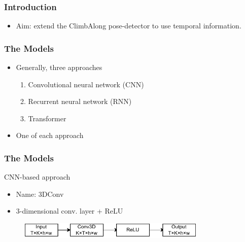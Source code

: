 \documentclass{beamer}
\begin{document}
\begin{frame}
    \frametitle{Introduction}
    \begin{itemize}
        \item<1-> Aim: extend the ClimbAlong pose-detector to use temporal information.
    \end{itemize}
\end{frame}

\begin{frame}
    \frametitle{The Models}
    \begin{itemize}
        \item<1-> Generally, three approaches
        \begin{enumerate}
            \item Convolutional neural network (CNN)
            \item Recurrent neural network (RNN)
            \item Transformer
        \end{enumerate}
        \item<2-> One of each approach
    \end{itemize}
    
\end{frame}

\begin{frame}
    \frametitle{The Models}
    CNN-based approach
    \begin{itemize}
        \item<1-> Name: 3DConv
        \item<1-> 3-dimensional conv. layer + ReLU
    \end{itemize}
    \begin{figure}
        \centering
        \includegraphics[width = 0.8\textwidth]{../report/entities/baseline.pdf}
    \end{figure}
\end{frame}
\end{document}
